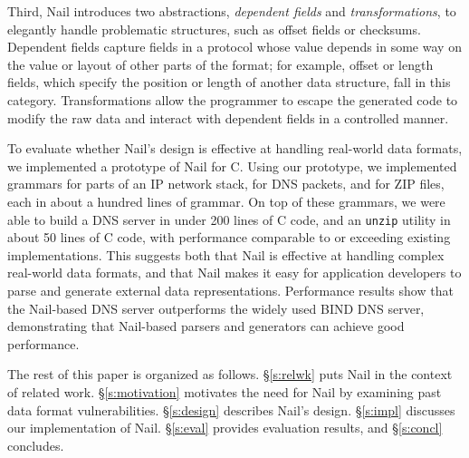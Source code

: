 
Third, Nail introduces two abstractions, \emph{dependent fields} and
\emph{transformations}, to elegantly handle problematic structures,
such as offset fields or checksums.  Dependent fields capture fields
in a protocol whose value depends in some way on the value or layout
of other parts of the format; for example, offset or length fields,
which specify the position or length of another data structure, fall
in this category.  Transformations allow the programmer to escape the
generated code to modify the raw data and interact with dependent fields
in a controlled manner.

To evaluate whether Nail's design is effective at handling real-world data
formats, we implemented a prototype of Nail for C\@. Using our prototype, we
implemented grammars for parts of an IP network stack, for DNS packets,
and for ZIP files, each in about a hundred lines of grammar. On top of these
grammars, we were able to build a DNS server in under 200 lines of C code, and
an {\tt unzip} utility in about 50 lines of C code, with performance comparable
to or exceeding existing implementations. This suggests both that Nail is
effective at handling complex real-world data formats, and that Nail makes it
easy for application developers to parse and generate external data
representations. Performance results show that the Nail-based DNS server
outperforms the widely used BIND DNS server, demonstrating that Nail-based
parsers and generators can achieve good performance.

The rest of this paper is organized as follows.  \S\ref{s:relwk}
puts Nail in the context of related work.
\S\ref{s:motivation} motivates the need for Nail by examining
past data format vulnerabilities.
\S\ref{s:design} describes
Nail's design.  \S\ref{s:impl} discusses our implementation
of Nail.  \S\ref{s:eval} provides evaluation results, and
\S\ref{s:concl} concludes.

